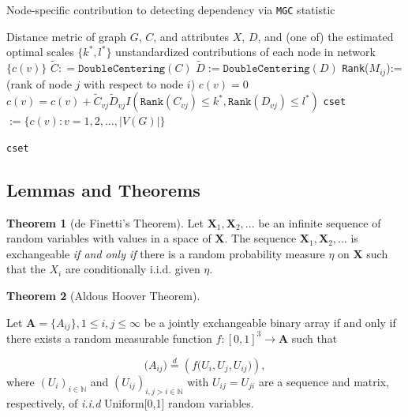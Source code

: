 \documentclass[12pt]{article}
\theoremstyle{definition}
\newtheorem{theorem}{Theorem}[section]
\begin{document}
\begin{algorithm}[H]
	\caption{Node-specific contribution to detecting dependency via \texttt{MGC} statistic}
	\begin{algorithmic}[1]
		\Require Distance metric of graph $G$, $C$, and attributes $X$, $D$, and (one of) the estimated optimal scales $\{ k^{*}, l^{*} \}$ 
		\Ensure  unstandardized contributions of each node in network $\{  c(v) \}$
		\State $\tilde{C} : = \texttt{DoubleCentering}(C)$
		\State $\tilde{D} := \texttt{DoubleCentering}(D)$
		\State \texttt{Rank}($M_{ij}$):= (rank of node $j$ with respect to node $i$)
		 
		\State $c(v) = 0$
		\Begin
		\State $c(v) =  c(v) + \tilde{C}_{vj} \tilde{D}_{v j} I(  \texttt{Rank}(C_{vj})  \leq k^{*}, \texttt{Rank}(D_{vj}) \leq l^{*} )$
		\End
		\EndFor
		\EndFor
		\State \texttt{cset} $:= \{ c(v) : v = 1,2, \ldots , |V(G)|  \}$	
		
		\Return  \texttt{cset}
		\EndFunction
	\end{algorithmic}
\end{algorithm}

\newpage
\subsection{Lemmas and Theorems}
	
\begin{theorem}[de Finetti's Theorem] 
\label{finetti}	
\bigskip			
Let $\mathbf{X}_{1}, \mathbf{X}_{2}, ...$ be an infinite sequence of random variables with values in a space of $\mathbf{X}$. The sequence $\mathbf{X}_{1}, \mathbf{X}_{2}, ...$ is exchangeable \textit{if and only if} there is a random probability measure $\eta$ on $\mathbf{X}$ such that the $X_{i}$ are conditionally i.i.d. given $\eta$. 
\end{theorem}
	
\begin{theorem}[Aldous Hoover Theorem]
		\label{Aldous_Hoover}
		
		Let $\mathbf{A} = \{A_{ij}\}, 1 \leq i,j \leq \infty$ be a jointly exchangeable binary array if and only if there exists a random measurable function $f : [0,1]^{3} \rightarrow \mathbf{A}$ such that 
		
		\begin{equation}
		\big(  A_{ij}  \big) \stackrel{d}{=} \left( f \big( U_{i}, U_{j}, U_{ij} \big)  \right),
		\end{equation}
		where $(U_{i})_{i \in \mathbb{N}}$ and $(U_{ij})_{i,j > i \in \mathbb{N}}$ with $U_{ij} = U_{ji}$ are a sequence and matrix, respectively, of \textit{i.i.d} Uniform[0,1] random variables. 
\end{theorem}
	
\end{document}
